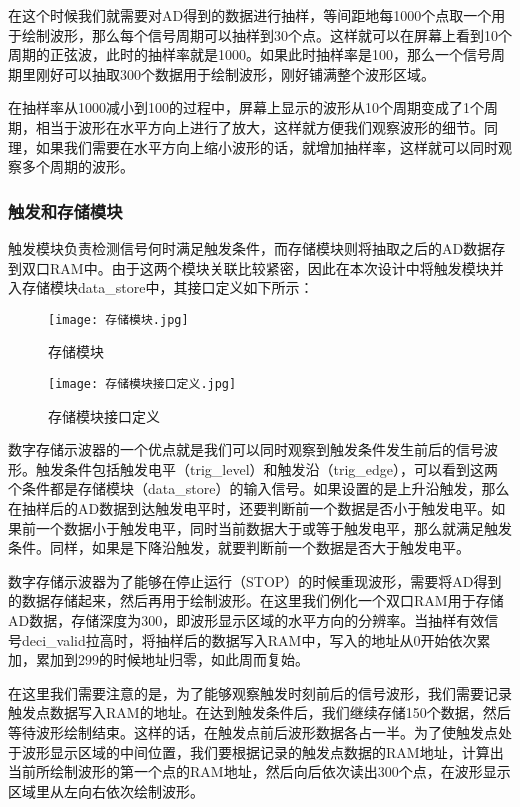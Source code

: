 \documentclass[lang=cn,a4paper,newtx]{elegantpaper}
\begin{document}
在这个时候我们就需要对AD得到的数据进行抽样，等间距地每1000个点取一个用于绘制波形，那么每个信号周期可以抽样到30个点。这样就可以在屏幕上看到10个周期的正弦波，此时的抽样率就是1000。如果此时抽样率是100，那么一个信号周期里刚好可以抽取300个数据用于绘制波形，刚好铺满整个波形区域。

在抽样率从1000减小到100的过程中，屏幕上显示的波形从10个周期变成了1个周期，相当于波形在水平方向上进行了放大，这样就方便我们观察波形的细节。同理，如果我们需要在水平方向上缩小波形的话，就增加抽样率，这样就可以同时观察多个周期的波形。

\subsubsection{触发和存储模块}
触发模块负责检测信号何时满足触发条件，而存储模块则将抽取之后的AD数据存到双口RAM中。由于这两个模块关联比较紧密，因此在本次设计中将触发模块并入存储模块data\_store中，其接口定义如下所示：
\begin{figure}[ht]
	\begin{minipage}[t]{0.48\textwidth}
		\centering
		\texttt{[image: 存储模块.jpg]}
		\caption{存储模块}
		\label{fig:存储模块}
	\end{minipage}
	\hfill %
	\begin{minipage}[t]{0.48\textwidth}
		\centering
		\texttt{[image: 存储模块接口定义.jpg]}
		\caption{存储模块接口定义}
		\label{fig:存储模块接口定义}
	\end{minipage}
\end{figure}
数字存储示波器的一个优点就是我们可以同时观察到触发条件发生前后的信号波形。触发条件包括触发电平（trig\_level）和触发沿（trig\_edge），可以看到这两个条件都是存储模块（data\_store）的输入信号。如果设置的是上升沿触发，那么在抽样后的AD数据到达触发电平时，还要判断前一个数据是否小于触发电平。如果前一个数据小于触发电平，同时当前数据大于或等于触发电平，那么就满足触发条件。同样，如果是下降沿触发，就要判断前一个数据是否大于触发电平。

数字存储示波器为了能够在停止运行（STOP）的时候重现波形，需要将AD得到的数据存储起来，然后再用于绘制波形。在这里我们例化一个双口RAM用于存储AD数据，存储深度为300，即波形显示区域的水平方向的分辨率。当抽样有效信号deci\_valid拉高时，将抽样后的数据写入RAM中，写入的地址从0开始依次累加，累加到299的时候地址归零，如此周而复始。

在这里我们需要注意的是，为了能够观察触发时刻前后的信号波形，我们需要记录触发点数据写入RAM的地址。在达到触发条件后，我们继续存储150个数据，然后等待波形绘制结束。这样的话，在触发点前后波形数据各占一半。为了使触发点处于波形显示区域的中间位置，我们要根据记录的触发点数据的RAM地址，计算出当前所绘制波形的第一个点的RAM地址，然后向后依次读出300个点，在波形显示区域里从左向右依次绘制波形。
\end{document}
